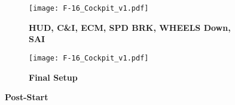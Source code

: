 \documentclass[fontInter]{TechCheck}
\begin{document}
	\begin{figure}[h]
		\centering
		\begin{subfigure}[t]{0.45\linewidth}
			\centering
			\texttt{[image: F-16\_Cockpit\_v1.pdf]}
			\caption*{\textbf{HUD, C\&I, ECM, SPD BRK, WHEELS Down, SAI}}
		\end{subfigure}
		\begin{subfigure}[t]{0.45\linewidth}
			\centering
			\texttt{[image: F-16\_Cockpit\_v1.pdf]}
			\caption*{\textbf{Final Setup}}
		\end{subfigure}
		\caption{\textbf{Post-Start}}
		\label{fig:proc:poststart2}
	\end{figure}

	\clearpage


	\clearpage
\end{document}
